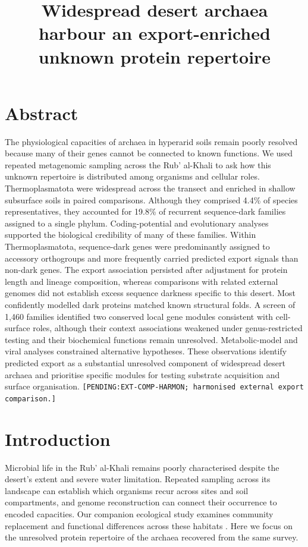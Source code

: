\documentclass[11pt]{article}
\title{\textbf{Widespread desert archaea harbour an export-enriched unknown protein repertoire}}
\date{}
\begin{document}
\maketitle

\section*{Abstract}
The physiological capacities of archaea in hyperarid soils remain poorly resolved because many of their genes cannot be connected to known functions. We used repeated metagenomic sampling across the Rub' al-Khali to ask how this unknown repertoire is distributed among organisms and cellular roles. Thermoplasmatota were widespread across the transect and enriched in shallow subsurface soils in paired comparisons. Although they comprised 4.4\% of species representatives, they accounted for 19.8\% of recurrent sequence-dark families assigned to a single phylum. Coding-potential and evolutionary analyses supported the biological credibility of many of these families. Within Thermoplasmatota, sequence-dark genes were predominantly assigned to accessory orthogroups and more frequently carried predicted export signals than non-dark genes. The export association persisted after adjustment for protein length and lineage composition, whereas comparisons with related external genomes did not establish excess sequence darkness specific to this desert. Most confidently modelled dark proteins matched known structural folds. A screen of 1,460 families identified two conserved local gene modules consistent with cell-surface roles, although their context associations weakened under genus-restricted testing and their biochemical functions remain unresolved. Metabolic-model and viral analyses constrained alternative hypotheses. These observations identify predicted export as a substantial unresolved component of widespread desert archaea and prioritise specific modules for testing substrate acquisition and surface organisation. \texttt{[PENDING:\allowbreak EXT-COMP-HARMON; harmonised external export comparison.]}

\section*{Introduction}

Microbial life in the Rub' al-Khali remains poorly characterised despite the desert's extent and severe water limitation. Repeated sampling across its landscape can establish which organisms recur across sites and soil compartments, and genome reconstruction can connect their occurrence to encoded capacities. Our companion ecological study examines community replacement and functional differences across these habitats \citep{rubalkhali_datapaper,tawfiq2026companion}. Here we focus on the unresolved protein repertoire of the archaea recovered from the same survey.
\end{document}
